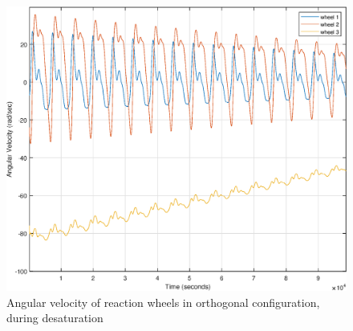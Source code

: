 		

		
		
		
		

		
%

\begin{figure}[H]
	\centering
	\includegraphics[width=0.7\linewidth]{figures/desaturation2}
	\caption{Angular velocity of reaction wheels in orthogonal configuration, during desaturation}
	\label{fig:desatspeed}
\end{figure}

